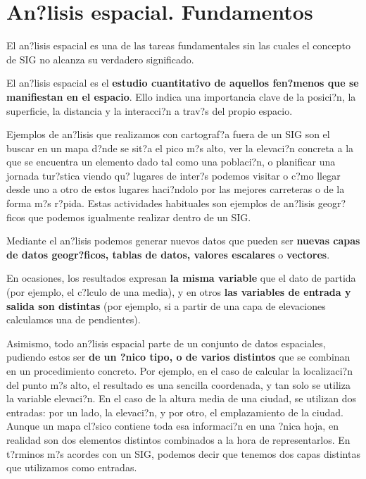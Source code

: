 
\chapter{An?lisis espacial. Fundamentos}



\pagestyle{fancy}

El an?lisis espacial es una de las tareas fundamentales sin las cuales el concepto de SIG no alcanza su verdadero significado. 

El an?lisis espacial es el \textbf{estudio cuantitativo de aquellos fen?menos que se manifiestan en el espacio}. Ello indica una importancia clave de la posici?n, la superficie, la distancia y la interacci?n a trav?s del propio espacio. 

Ejemplos de an?lisis que realizamos con cartograf?a fuera de un SIG son el buscar en un mapa d?nde se sit?a el pico m?s alto, ver la elevaci?n concreta a la que se encuentra un elemento dado tal como una poblaci?n, o planificar una jornada tur?stica viendo qu? lugares de inter?s podemos visitar o c?mo llegar desde uno a otro de estos lugares haci?ndolo por las mejores carreteras o de la forma m?s r?pida. Estas actividades habituales son ejemplos de an?lisis geogr?ficos que podemos igualmente realizar dentro de un SIG.

Mediante el an?lisis podemos generar nuevos datos que pueden ser \textbf{nuevas capas de datos geogr?ficos, tablas de datos, valores escalares} o \textbf{vectores}.

En ocasiones, los resultados expresan \textbf{la misma variable} que el dato de partida (por ejemplo, el c?lculo de una media), y en otros \textbf{las variables de entrada y salida son distintas} (por ejemplo, si a partir de una capa de elevaciones calculamos una de pendientes).

Asimismo, todo an?lisis espacial parte de un conjunto de datos espaciales, pudiendo estos ser \textbf{de un ?nico tipo, o de varios distintos} que se combinan en un procedimiento concreto. Por ejemplo, en el caso de calcular la localizaci?n del punto m?s alto, el resultado es una sencilla coordenada, y tan solo se utiliza la variable elevaci?n. En el caso de la altura media de una ciudad, se utilizan dos entradas: por un lado, la elevaci?n, y por otro, el emplazamiento de la ciudad. Aunque un mapa cl?sico contiene toda esa informaci?n en una ?nica hoja, en realidad son dos elementos distintos combinados a la hora de representarlos. En t?rminos m?s acordes con un SIG, podemos decir que tenemos dos capas distintas que utilizamos como entradas.

